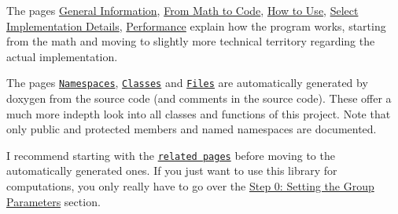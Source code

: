 \begin{DoxyItemize}
\item The pages \hyperlink{index}{General Information}, \hyperlink{math}{From Math to Code}, \hyperlink{use}{How to Use}, \hyperlink{algo}{Select Implementation Details}, \hyperlink{perf}{Performance} explain how the program works, starting from the math and moving to slightly more technical territory regarding the actual implementation.
\item The pages \href{namespaces.html}{\tt Namespaces}, \href{annotated.html}{\tt Classes} and \href{files.html}{\tt Files} are automatically generated by doxygen from the source code (and comments in the source code). These offer a much more indepth look into all classes and functions of this project. Note that only public and protected members and named namespaces are documented.
\item I recommend starting with the \href{namespaces.html}{\tt related pages} before moving to the automatically generated ones. If you just want to use this library for computations, you only really have to go over the \hyperlink{use_how}{Step 0\+: Setting the Group Parameters} section. 
\end{DoxyItemize}